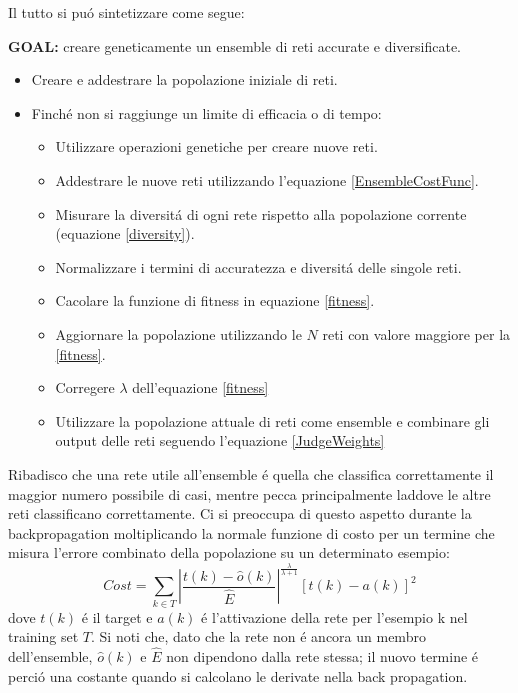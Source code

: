 \documentclass[a4paper,12pt]{report}
\begin{document}
  Il tutto si pu\'o sintetizzare come segue:
  
  \textbf{GOAL:} creare geneticamente un ensemble di reti accurate e diversificate.
  \begin{itemize}
   \item Creare e addestrare la popolazione iniziale di reti.
   \item Finch\'e non si raggiunge un limite di efficacia o di tempo:
   \begin{itemize}
    \item Utilizzare operazioni genetiche per creare nuove reti.
    \item Addestrare le nuove reti utilizzando l'equazione \ref{EnsembleCostFunc}.
    \item Misurare la diversit\'a di ogni rete rispetto alla popolazione corrente (equazione \ref{diversity}).
    \item Normalizzare i termini di accuratezza e diversit\'a delle singole reti.
    \item Cacolare la funzione di fitness in equazione \ref{fitness}.
    \item Aggiornare la popolazione utilizzando le $N$ reti con valore maggiore per la \ref{fitness}.
    \item Corregere $\lambda$ dell'equazione \ref{fitness}
    \item Utilizzare la popolazione attuale di reti come ensemble e combinare gli output delle reti seguendo l'equazione \ref{JudgeWeights}
   \end{itemize}
  \end{itemize}
  Ribadisco che una rete utile all'ensemble \'e quella che classifica correttamente il maggior numero possibile di casi, mentre pecca principalmente laddove le altre reti classificano correttamente. 
  Ci si preoccupa di questo aspetto durante la backpropagation moltiplicando la normale funzione di costo per un termine che misura l'errore combinato della popolazione su un determinato esempio:
  \begin{equation}
   Cost = \sum_{k \in T} \left| \frac{t \left(k\right) - \widehat{o} \left(k\right)}{\widehat{E}} \right|^{\frac{\lambda}{\lambda + 1}} \left[ t\left(k\right) - a\left(k\right) \right]^2 \label{EnsembleCostFunc}
  \end{equation}
  dove $t(k)$ \'e il target e $a(k)$ \'e l'attivazione della rete per l'esempio k nel training set $T$. 
  Si noti che, dato che la rete non \'e ancora un membro dell'ensemble, $\widehat{o} (k)$ e $\widehat{E}$ non dipendono dalla  rete stessa; il nuovo termine \'e perci\'o una costante quando si calcolano le derivate nella back propagation. 
\end{document}
